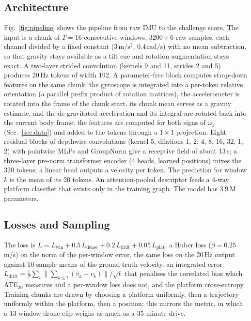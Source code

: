 \documentclass[letterpaper,10pt,conference]{ieeeconf}
\begin{document}
\subsection{Architecture}
Fig.~\ref{fig:pipeline} shows the pipeline from raw IMU to the challenge score. The input is a chunk of $T=16$ consecutive windows, $3200 \times 6$ raw
samples, each channel divided by a fixed constant ($3\,\mathrm{m/s^2}$, $0.4\,\mathrm{rad/s}$) with no mean
subtraction, so that gravity stays available as a tilt cue and rotation augmentation stays exact. A two-layer strided
convolution (kernels 9 and 11, strides 2 and 5) produces 20\,Hz tokens of width 192. A parameter-free block computes
strap-down features on the same chunk: the gyroscope is integrated into a per-token relative orientation (a parallel
prefix product of rotation matrices), the accelerometer is rotated into the frame of the chunk start, its chunk mean
serves as a gravity estimate, and the de-gravitated acceleration and its integral are rotated back into the current
body frame; the features are computed for both signs of $\omega_z$ (Sec.~\ref{sec:data}) and added to the tokens
through a $1\times 1$ projection. Eight residual blocks of depthwise convolutions (kernel 5, dilations 1, 2, 4, 8, 16,
32, 1, 2) with pointwise MLPs and GroupNorm give a receptive field of about 13\,s; a three-layer pre-norm transformer
encoder (4 heads, learned positions) mixes the 320 tokens; a linear head outputs a velocity per token. The prediction
for window $k$ is the mean of its 20 tokens. An attention-pooled descriptor feeds a 4-way platform classifier that
exists only in the training graph. The model has 3.9\,M parameters.

\subsection{Losses and Sampling}
The loss is $L = L_{\mathrm{win}} + 0.5\,L_{\mathrm{dense}} + 0.2\,L_{\mathrm{drift}} + 0.05\,L_{\mathrm{plat}}$:
a Huber loss ($\beta = 0.25$\,m/s) on the norm of the per-window error, the same loss on the 20\,Hz output against
10-sample means of the ground-truth velocity, an integrated error
$L_{\mathrm{drift}} = \frac{1}{T}\sum_t \lVert \sum_{k \le t} (\hat v_k - v_k)\rVert / \sqrt{t}$ that penalises the
correlated bias which ATE$_{20}$ measures and a per-window loss does not, and the platform cross-entropy. Training
chunks are drawn by choosing a platform uniformly, then a trajectory uniformly within the platform, then a position;
this mirrors the metric, in which a 13-window drone clip weighs as much as a 35-minute drive.
\end{document}
